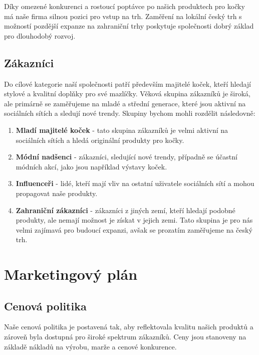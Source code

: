 \documentclass[12pt, a4paper]{article}
\begin{document}
\vspace{10pt}
\noindent Díky omezené konkurenci a rostoucí poptávce po našich produktech pro kočky má naše firma silnou pozici pro vstup na trh.
Zaměření na lokální český trh s možností pozdější expanze na zahraniční trhy poskytuje společnosti dobrý základ pro dlouhodobý rozvoj.

\subsection{Zákazníci}

Do cílové kategorie naší společnosti patří především majitelé koček, kteří hledají stylové a kvalitní doplňky pro své mazlíčky.
Věková skupina zákazníků je široká, ale primárně se zaměřujeme na mladé a střední generace, které jsou aktivní na sociálních sítích a sledují nové trendy.
Skupiny bychom mohli rozdělit následovně:

\begin{enumerate}
  \item \textbf{Mladí majitelé koček} - tato skupina zákazníků je velmi aktivní 
  na sociálních sítích a hledá originální produkty pro kočky.
  \item \textbf{Módní nadšenci} - zákazníci, sledující nové trendy,
  případně se účastní módních akcí, jako jsou například výstavy koček.
  \item \textbf{Influenceři} - lidé, kteří mají vliv na ostatní uživatele 
  sociálních sítí a mohou propagovat naše produkty.
  \item \textbf{Zahraniční zákazníci} - zákazníci z jiných zemí, kteří hledají
  podobné produkty, ale nemají možnost je získat v jejich zemi. Tato skupina je pro
  nás velmi zajímavá pro budoucí expanzi, avšak se prozatím zaměřujeme na český trh.
\end{enumerate}

\pagebreak

\section{Marketingový plán}

\subsection{Cenová politika}

Naše cenová politika je postavená tak, aby reflektovala kvalitu našich produktů
a zároveň byla dostupná pro široké spektrum zákazníků.
Ceny jsou stanoveny na základě nákladů na výrobu, marže a cenové konkurence.
\end{document}
